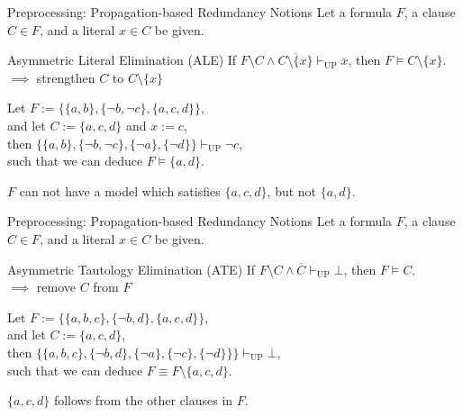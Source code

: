 \documentclass[t]{sdqbeamer}
\begin{document}
\begin{frame}{Preprocessing: Propagation-based Redundancy Notions}
Let a formula $F$, a clause $C \in F$, and a literal $x \in C$ be given.
\begin{block}{Asymmetric Literal Elimination (ALE)}
If $F \setminus C \land \overline{C \setminus \{ x \}} \vdash_{\mathop{UP}} \overline x$, then $F \models C \setminus \{ x \}$.\\[1ex]
$\implies$ strengthen $C$ to $C \setminus \{ x \}$
\end{block}
\begin{example}
Let $F := \bigl\{ \{a, b\}, \{\lnot b, \lnot c\}, \{a, c, d\} \bigr\}$,\\[1ex]
and let $C := \{a, c, d\}$ and $x := c$,\\[1ex]
then $\bigl\{ \{a, b\}, \{\lnot b, \lnot c\}, \{\lnot a \}, \{\lnot d\} \bigr\} \vdash_{\mathop{UP}} \lnot c$,\\[1ex]
such that we can deduce $F \models \{a, d\}$.
\end{example}
$F$ can not have a model which satisfies $\{a, c, d\}$, but not $\{a, d\}$.
\end{frame}
    

\begin{frame}{Preprocessing: Propagation-based Redundancy Notions}
Let a formula $F$, a clause $C \in F$, and a literal $x \in C$ be given.
\begin{block}{Asymmetric Tautology Elimination (ATE)}
If $F \setminus C \land \overline C \vdash_{\mathop{UP}} \bot$, then $F \models C$.\\[1ex]
$\implies$ remove $C$ from $F$
\end{block}
\begin{example}
Let $F := \bigl\{ \{a, b, c\}, \{\lnot b, d\}, \{a, c, d\} \bigr\}$,\\[1ex]
and let $C := \{a, c, d\}$,\\[1ex]
then $\bigl\{ \{a, b, c\}, \{\lnot b, d\}, \{\lnot a\}, \{\lnot c\}, \{\lnot d\}\} \bigr\} \vdash_{\mathop{UP}} \bot$,\\[1ex]
such that we can deduce $F \equiv F \setminus \{a,c,d\}$.
\end{example}
$\{a,c,d\}$ follows from the other clauses in $F$.
\end{frame}
\end{document}
